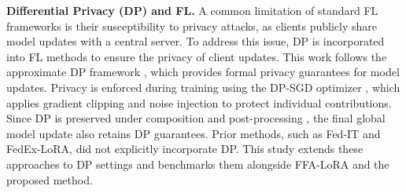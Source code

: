 \textbf{Differential Privacy (DP) and FL.}
A common limitation of standard FL frameworks is their susceptibility to privacy attacks, as clients publicly share model updates with a central server. 
To address this issue, DP is incorporated into FL methods to ensure the privacy of client updates. 
This work follows the approximate DP framework \citep{dwork2006differential, dwork2014algorithmic}, which provides formal privacy guarantees for model updates.
Privacy is enforced during training using the DP-SGD optimizer \citep{dgsgd}, which applies gradient clipping and noise injection to protect individual contributions. 
Since DP is preserved under composition and post-processing \citep{dwork2006differential, 10.14778/3503585.3503598}, the final global model update also retains DP guarantees.
Prior methods, such as Fed-IT and FedEx-LoRA, did not explicitly incorporate DP. 
This study extends these approaches to DP settings and benchmarks them alongside FFA-LoRA and the proposed method.